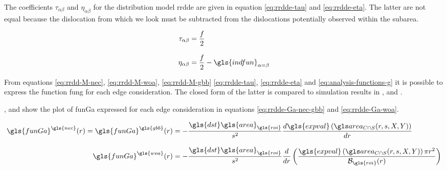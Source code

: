 \subsubsection{}

The coefficients \( \tau_{\alpha \beta} \) and \( \eta_{\alpha \beta} \) for the distribution model \gls{rrdde} are given in equation \eqref{eq:rrdde-tau} and \eqref{eq:rrdde-eta}.
The latter are not equal because the dislocation from which we look must be subtracted from the dislocations potentially observed within the subarea.

\begin{align}
  \tau_{\alpha \beta} &=
    \frac{f}{2}
    \label{eq:rrdde-tau}
  \\[3mm]
  \eta_{\alpha \beta} &=
    \frac{f}{2} - \gls{indfun}_{\alpha = \beta}
    \label{eq:rrdde-eta}
\end{align}

\bigskip

From equations \eqref{eq:rrdd-M-nec}, \eqref{eq:rrdd-M-woa}, \eqref{eq:rrdd-M-gbb} \eqref{eq:rrdde-tau}, \eqref{eq:rrdde-eta} and \eqref{eq:analysis-functions-g} it is possible to express the function \gls{fung} for each edge consideration.
The closed form of the latter is compared to simulation results in ,  and .

%
%
%

\bigskip

,  and  show the plot of \gls{funGa} expressed for each edge consideration in equations \eqref{eq:rrdde-Ga-nec-gbb} and \eqref{eq:rrdde-Ga-woa}.

\begin{align}
  \gls{funGa}^{\gls{nec}} (r) =
  \gls{funGa}^{\gls{gbb}} (r) &=
    - \frac{\gls{dst} \gls{area}_{\gls{roi}}}{s^2} \frac{d \gls{expval} \left( \cirsqr(r, s, X, Y) \right)}{dr}
    \label{eq:rrdde-Ga-nec-gbb}
  \\[3mm]
  \gls{funGa}^{\gls{woa}} (r) &=
    - \frac{\gls{dst} \gls{area}_{\gls{roi}}}{s^2} \frac{d}{dr} \left( \frac{\gls{expval} \left( \cirsqr(r, s, X, Y) \right) \pi r^2}{ \mathcal{B}_{\gls{roi}}(r)} \right)
    \label{eq:rrdde-Ga-woa}
\end{align}

